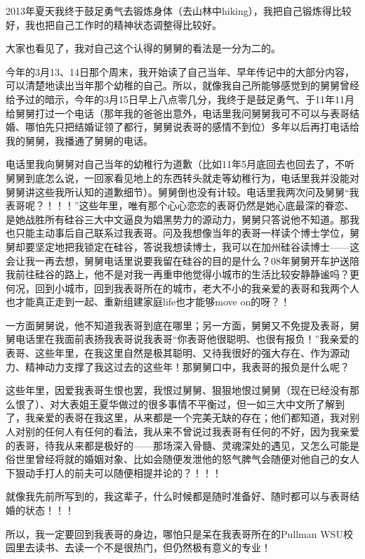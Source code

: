 \documentclass[9pt, b5paper]{article}
\begin{document}
2013年夏天我终于鼓足勇气去锻炼身体（去山林中hiking），我把自己锻炼得比较好，我也把自己工作时的精神状态调整得比较好。

大家也看见了，我对自己这个认得的舅舅的看法是一分为二的。

今年的3月13、14日那个周末，我开始读了自己当年、早年传记中的大部分内容，可以清楚地读出当年那个幼稚的自己。所以，就像我自己所能够感觉到的舅舅曾经给予过的暗示，今年的3月15日早上八点零几分，我终于是鼓足勇气、于11年11月给舅舅打过一个电话（那年我的爸爸出意外，电话里我问舅舅我可不可以与表哥结婚、哪怕先只把结婚证领了都行，舅舅说表哥的感情不到位）多年以后再打电话给我的舅舅，我播通了舅舅的电话。 

电话里我向舅舅对自己当年的幼稚行为道歉（比如11年5月底回去也回去了，不听舅舅到底怎么说，一回家看见地上的东西转头就走等幼稚行为，电话里我并没能对舅舅讲这些我所认知的道歉细节）。舅舅倒也没有计较。电话里我两次问及舅舅“我表哥呢？！！！”这些年里，唯有那个心心恋恋的表哥仍然是她心底最深的眷恋、是她战胜所有硅谷三大中文逼良为娼黑势力的源动力，舅舅只答说他不知道。那我也只能主动事后自己联系过我表哥。问及我想像当年的表哥一样读个博士学位，舅舅却要坚定地把我锁定在硅谷，答说我想读博士，我可以在加州硅谷读博士——这会让我一再去想，舅舅电话里说要我留在硅谷的目的是什么？08年舅舅开车护送陪我前往硅谷的路上，他不是对我一再重申他觉得小城市的生活比较安静静谧吗？更何况，回到小城市，回到我表哥所在的城市，老大不小的我亲爱的表哥和我两个人也才能真正走到一起、重新组建家庭life也才能够move on的呀？！

一方面舅舅说，他不知道我表哥到底在哪里；另一方面，舅舅又不免提及表哥，舅舅电话里在我面前表扬我表哥说我表哥“你表哥他很聪明、也很有报负！”我亲爱的表哥、这些年里，在我这里自然是极其聪明、又待我很好的强大存在、作为源动力、精神动力支撑了我这过去的这些年！那舅舅口中，我表哥的报负是什么呢？

这些年里，因爱我表哥生恨也罢，我恨过舅舅、狠狠地恨过舅舅（现在已经没有那么恨了）、对大表姐王夏华做过的很多事情不平衡过，但一如三大中文所了解到了，我亲爱的表哥在我这里，从来都是一个完美无缺的存在；他们都知道，我对别人对别的任何人有任何的看法，我从来不曾说过我表哥有任何的不好，因为我亲爱的表哥，待我从来都是极好的——那场深入骨髓、灵魂深处的遇见，又怎么可能是俗世里曾经将就的婚姻对象、比如会随便发泄他的怒气脾气会随便对他自己的女人下狠动手打人的前夫可以随便相提并论的？！！！

就像我先前所写到的，我这辈子，什么时候都是随时准备好、随时都可以与表哥结婚的状态！！！

所以，我一定要回到我表哥的身边，哪怕只是呆在我表哥所在的Pullman WSU校园里去读书、去读一个不是很热门，但仍然极有意义的专业！
\end{document}
